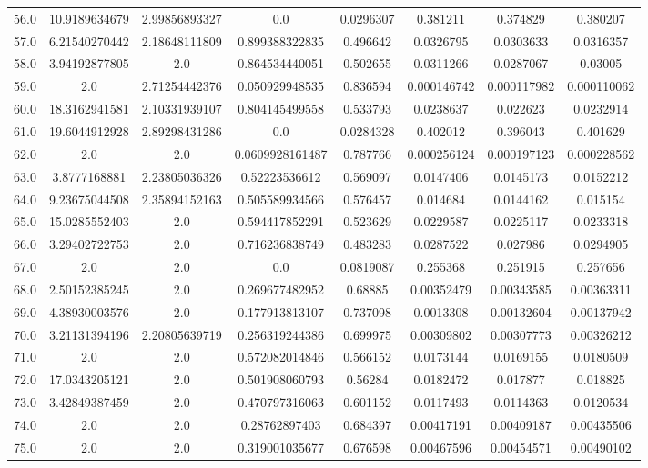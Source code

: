 \begin{longtable}{|c|c|c|c|c|c|c|c|}
56.0 & 10.9189634679 & 2.99856893327 & 0.0 & 0.0296307 & 0.381211 & 0.374829 & 0.380207 \\
57.0 & 6.21540270442 & 2.18648111809 & 0.899388322835 & 0.496642 & 0.0326795 & 0.0303633 & 0.0316357 \\
58.0 & 3.94192877805 & 2.0 & 0.864534440051 & 0.502655 & 0.0311266 & 0.0287067 & 0.03005 \\
59.0 & 2.0 & 2.71254442376 & 0.050929948535 & 0.836594 & 0.000146742 & 0.000117982 & 0.000110062 \\
60.0 & 18.3162941581 & 2.10331939107 & 0.804145499558 & 0.533793 & 0.0238637 & 0.022623 & 0.0232914 \\
61.0 & 19.6044912928 & 2.89298431286 & 0.0 & 0.0284328 & 0.402012 & 0.396043 & 0.401629 \\
62.0 & 2.0 & 2.0 & 0.0609928161487 & 0.787766 & 0.000256124 & 0.000197123 & 0.000228562 \\
63.0 & 3.8777168881 & 2.23805036326 & 0.52223536612 & 0.569097 & 0.0147406 & 0.0145173 & 0.0152212 \\
64.0 & 9.23675044508 & 2.35894152163 & 0.505589934566 & 0.576457 & 0.014684 & 0.0144162 & 0.015154 \\
65.0 & 15.0285552403 & 2.0 & 0.594417852291 & 0.523629 & 0.0229587 & 0.0225117 & 0.0233318 \\
66.0 & 3.29402722753 & 2.0 & 0.716236838749 & 0.483283 & 0.0287522 & 0.027986 & 0.0294905 \\
67.0 & 2.0 & 2.0 & 0.0 & 0.0819087 & 0.255368 & 0.251915 & 0.257656 \\
68.0 & 2.50152385245 & 2.0 & 0.269677482952 & 0.68885 & 0.00352479 & 0.00343585 & 0.00363311 \\
69.0 & 4.38930003576 & 2.0 & 0.177913813107 & 0.737098 & 0.0013308 & 0.00132604 & 0.00137942 \\
70.0 & 3.21131394196 & 2.20805639719 & 0.256319244386 & 0.699975 & 0.00309802 & 0.00307773 & 0.00326212 \\
71.0 & 2.0 & 2.0 & 0.572082014846 & 0.566152 & 0.0173144 & 0.0169155 & 0.0180509 \\
72.0 & 17.0343205121 & 2.0 & 0.501908060793 & 0.56284 & 0.0182472 & 0.017877 & 0.018825 \\
73.0 & 3.42849387459 & 2.0 & 0.470797316063 & 0.601152 & 0.0117493 & 0.0114363 & 0.0120534 \\
74.0 & 2.0 & 2.0 & 0.28762897403 & 0.684397 & 0.00417191 & 0.00409187 & 0.00435506 \\
75.0 & 2.0 & 2.0 & 0.319001035677 & 0.676598 & 0.00467596 & 0.00454571 & 0.00490102 \\

\end{longtable}
